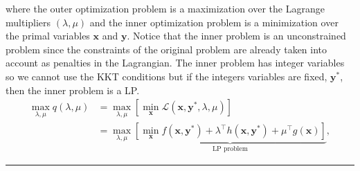 where the outer optimization problem is a maximization over the Lagrange multipliers $\left(\lambda,\mu\right)$ and the inner optimization problem is a minimization over the primal variables $\mathbf{x}$ and $\mathbf{y}$. Notice that the inner problem is an unconstrained problem since the constraints of the original problem are already taken into account as penalties in the Lagrangian. The inner problem has integer variables so we cannot use the KKT conditions but if the integers variables are fixed, $\mathbf{y}^{*}$, then the inner problem is a LP.
\begin{align}
    \max_{\lambda,\mu} q(\lambda,\mu) &=\max_{\lambda,\mu}\left[\min_{\mathbf{x}}\mathcal{L}(\mathbf{x}, \mathbf{y}^{*},\lambda,\mu)\right] \\
    &= \max_{\lambda,\mu}\underbrace{\left[\min_{\mathbf{x}}f(\mathbf{x}, \mathbf{y}^{*}) + \lambda^{\intercal}h(\mathbf{x}, \mathbf{y}^{*}) + \mu^{\intercal}g(\mathbf{x})\right]}_{\text{LP problem}} ,
\end{align}
  \vspace{6pt}
    \hrule
